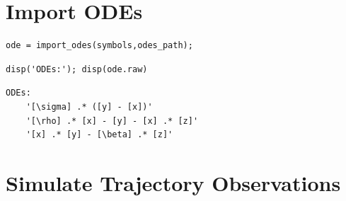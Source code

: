 \section{Import ODEs}

\color{RoyalPurple}\begin{verbatim}
ode = import_odes(symbols,odes_path);
\end{verbatim}
\color{black}
\color{RoyalPurple}\begin{verbatim}
disp('ODEs:'); disp(ode.raw)
\end{verbatim}
\color{black}

        \begin{verbatim}ODEs:
    '[\sigma] .* ([y] - [x])'
    '[\rho] .* [x] - [y] - [x] .* [z]'
    '[x] .* [y] - [\beta] .* [z]'

\end{verbatim}
\color{black}


\section{Simulate Trajectory Observations}

